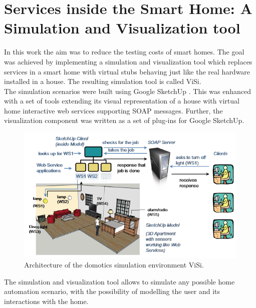 \section{Services inside the Smart Home: A Simulation and Visualization tool}\label{sec:services_in_smart_homes}

In this work \cite{lazovik2009services} the aim was to reduce the testing costs of smart homes. The goal was achieved by implementing a simulation and visualization tool which replaces services in a smart home with virtual stubs behaving just like the real hardware installed in a house. The resulting simulation tool is called ViSi.\\

The simulation scenarios were built using Google SketchUp \cite{sketchup:online}. This was enhanced with a set of tools extending its visual representation of a house with virtual home interactive web services supporting SOAP messages. Further, the visualization component was written as a set of plug-ins for Google SketchUp.\\

\begin{figure}[H]
	\centering
	\includegraphics[width=\linewidth]{gfx/Chapter2/services_in_smarthomes}
	\caption{Architecture of the domotics simulation environment ViSi.}
	\label{fig:diasim_architecture}
\end{figure}

The simulation and visualization tool allows to simulate any possible home automation scenario, with the possibility of modelling the user and its interactions with the home.
